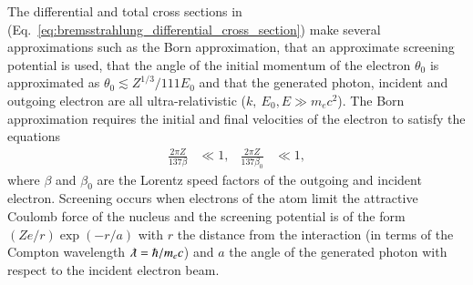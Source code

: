 \documentclass[../main.tex]{subfiles}
\begin{document}
The differential and total cross sections in (Eq.~\ref{eq:bremsstrahlung_differential_cross_section}) make several approximations such as the Born approximation, that an approximate screening potential is used, that the angle of the initial momentum of the electron $\theta_{0}$ is approximated as $\theta_{0} \lesssim Z^{1/3}/111E_{0}$ and that the generated photon, incident and outgoing electron are all ultra-relativistic ($k,~E_{0},E \gg m_{e}c^{2}$). The Born approximation requires the initial and final velocities of the electron to satisfy the equations
\begin{align}
\frac{2\pi Z}{137\beta} &\ll 1, & \frac{2\pi Z}{137\beta_{0}} &\ll 1,
\label{eq:Born_approximation}    
\end{align}
where $\beta$ and $\beta_{0}$ are the Lorentz speed factors of the outgoing and incident electron. Screening occurs when electrons of the atom limit the attractive Coulomb force of the nucleus and the screening potential is of the form $\left(Ze/r\right)\exp\left(-r/a\right)$ \cite{schiff1951energy} with $r$ the distance from the interaction (in terms of the Compton wavelength $\lambdabar = \hbar/m_{e}c$) and $a$ the angle of the generated photon with respect to the incident electron beam.
\end{document}
